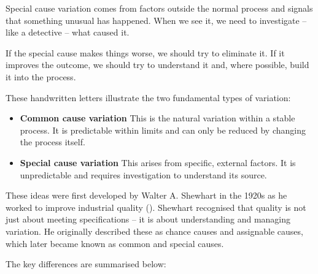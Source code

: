 \documentclass[
]{book}
\begin{document}
Special cause variation comes from factors outside the normal process
and signals that something unusual has happened. When we see it, we need
to investigate -- like a detective -- what caused it.

If the special cause makes things worse, we should try to eliminate it.
If it improves the outcome, we should try to understand it and, where
possible, build it into the process.

These handwritten letters illustrate the two fundamental types of
variation:

\begin{itemize}
\item
  \textbf{Common cause variation} This is the natural variation within a
  stable process. It is predictable within limits and can only be
  reduced by changing the process itself.
\item
  \textbf{Special cause variation} This arises from specific, external
  factors. It is unpredictable and requires investigation to understand
  its source.
\end{itemize}

These ideas were first developed by Walter A. Shewhart in the 1920s as
he worked to improve industrial quality
(). Shewhart recognised that
quality is not just about meeting specifications -- it is about
understanding and managing variation. He originally described these as
chance causes and assignable causes, which later became known as common
and special causes.

The key differences are summarised below:
\end{document}
